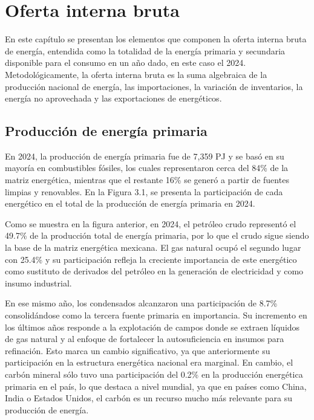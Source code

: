 \documentclass{sener2025}
\begin{document}

\section{Oferta interna bruta}

En este capítulo se presentan los elementos que componen la oferta interna bruta de energía, entendida como la totalidad de la energía primaria y secundaria disponible para el consumo en un año dado, en este caso el 2024. Metodológicamente, la oferta interna bruta es la suma algebraica de la producción nacional de energía, las importaciones, la variación de inventarios, la energía no aprovechada y las exportaciones de energéticos.


\subsection{Producción de energía primaria}

En 2024, la producción de energía primaria fue de 7,359 PJ y se basó en su mayoría en combustibles fósiles, los cuales representaron cerca del 84\% de la matriz energética, mientras que el restante 16\% se generó a partir de fuentes limpias y renovables. En la Figura 3.1, se presenta la participación de cada energético en el total de la producción de energía primaria en 2024.

Como se muestra en la figura anterior, en 2024, el petróleo crudo representó el 49.7\% de la producción total de energía primaria, por lo que el crudo sigue siendo la base de la matriz energética mexicana. El gas natural ocupó el segundo lugar con 25.4\% y su participación refleja la creciente importancia de este energético como sustituto de derivados del petróleo en la generación de electricidad y como insumo industrial.

En ese mismo año, los condensados alcanzaron una participación de 8.7\% consolidándose como la tercera fuente primaria en importancia. Su incremento en los últimos años responde a la explotación de campos donde se extraen líquidos de gas natural y al enfoque de fortalecer la autosuficiencia en insumos para refinación. Esto marca un cambio significativo, ya que anteriormente su participación en la estructura energética nacional era marginal. En cambio, el carbón mineral sólo tuvo una participación del 0.2\% en la producción energética primaria en el país, lo que destaca a nivel mundial, ya que en países como China, India o Estados Unidos, el carbón es un recurso mucho más relevante para su producción de energía.
\end{document}
